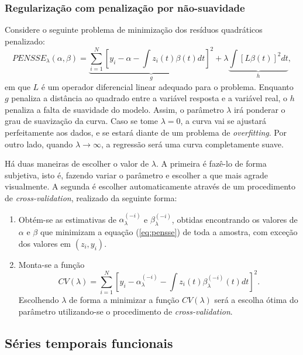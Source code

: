 \documentclass[
	12pt,				%
	openright,			%
	oneside,			%
	a4paper,			%
	english,			%
	brazil				%
	]{dissertacao-ufrgs-abntex2}
\begin{document}
\subsubsection*{Regularização com penalização por não-suavidade}

Considere o seguinte problema de minimização dos resíduos quadráticos
penalizado:
\begin{equation}
PENSSE_{\lambda}(\alpha,\beta)=\underbrace{\sum_{i=1}^{N}[y_{i}-\alpha-\int z_{i}(t)\beta(t)dt]^{2}}_{g}+\lambda\underbrace{\int[L\beta(t)]^{2}dt}_{h},\label{eq:pensse}
\end{equation}
em que $L$ é um operador diferencial linear adequado para o problema.
Enquanto $g$ penaliza a distância ao quadrado entre a variável resposta
e a variável real, o $h$ penaliza a falta de suavidade do modelo.
Assim, o parâmetro $\lambda$ irá ponderar o grau de suavização da
curva. Caso se tome $\lambda=0$, a curva vai se ajustará perfeitamente
aos dados, e se estará diante de um problema de \emph{overfitting}. Por outro lado,
quando $\lambda\rightarrow\infty$, a regressão será uma curva completamente
suave.

Há duas maneiras de escolher o valor de $\lambda$. A primeira é fazê-lo
de forma subjetiva, isto é, fazendo variar o parâmetro e escolher
a que mais agrade visualmente. A segunda é escolher automaticamente
através de um procedimento de \emph{cross-validation},
realizado da seguinte forma:
\begin{enumerate}
\item Obtém-se as estimativas de $\alpha_{\lambda}^{(-i)}$ e $\beta_{\lambda}^{(-i)}$,
obtidas encontrando os valores de $\alpha$ e $\beta$ que minimizam
a equação (\ref{eq:pensse}) de toda a amostra, com exceção dos valores
em $(z_{i},y_{i})$. 
\item Monta-se a função 
\[
CV(\lambda)=\sum_{i=1}^{N}[y_{i}-\alpha_{\lambda}^{(-i)}-\int z_{i}(t)\beta_{\lambda}^{(-i)}(t)dt]^{2}.
\]
Escolhendo $\lambda$ de forma a minimizar a função $CV(\lambda)$
será a escolha ótima do parâmetro utilizando-se o procedimento de
\emph{cross-validation}.
\end{enumerate}

\subsection{Séries temporais funcionais}
\end{document}
